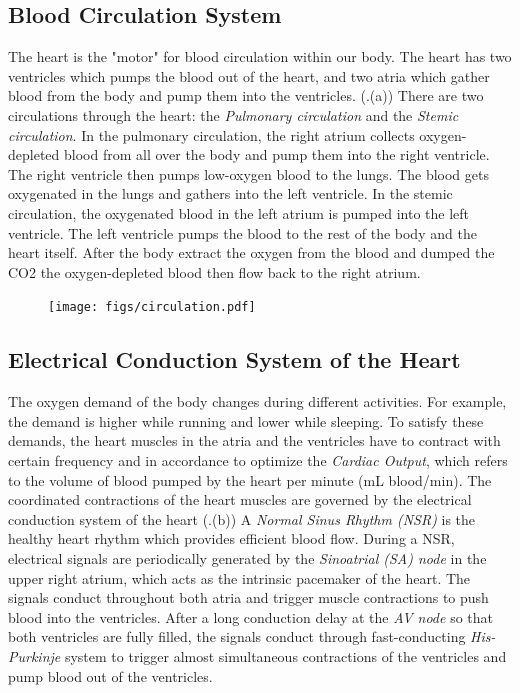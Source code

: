 \subsection{Blood Circulation System}
The heart is the "motor" for blood circulation within our body. The heart has two ventricles which pumps the blood out of the heart, and two atria which gather blood from the body and pump them into the ventricles. (.(a)) There are two circulations through the heart: the \emph{Pulmonary circulation} and the \emph{Stemic circulation}. In the pulmonary circulation, the right atrium collects oxygen-depleted blood from all over the body and pump them into the right ventricle. The right ventricle then pumps low-oxygen blood to the lungs. The blood gets oxygenated in the lungs and gathers into the left ventricle. In the stemic circulation, the oxygenated blood in the left atrium is pumped into the left ventricle. The left ventricle pumps the blood to the rest of the body and the heart itself. After the body extract the oxygen from the blood and dumped the CO2 the oxygen-depleted blood then flow back to the right atrium.
\begin{figure}[!t]
\centering
		\texttt{[image: figs/circulation.pdf]}
		
\caption{\small }
\label{fig:circulation}
\end{figure} 
\subsection{Electrical Conduction System of the Heart}
The oxygen demand of the body changes during different activities. For example, the demand is higher while running and lower while sleeping. To satisfy these demands, the heart muscles in the atria and the ventricles have to contract with certain frequency and in accordance to optimize the \emph{Cardiac Output}, which refers to the volume of blood pumped by the heart per minute (mL blood/min). The coordinated contractions of the heart muscles are governed by the electrical conduction system of the heart (.(b)) A \emph{Normal Sinus Rhythm (NSR)} is the healthy heart rhythm which provides efficient blood flow. During a NSR, electrical signals are periodically generated by the \emph{Sinoatrial (SA) node} in the upper right atrium, which acts as the intrinsic pacemaker of the heart. The signals conduct throughout both atria and trigger muscle contractions to push blood into the ventricles. After a long conduction delay at the \emph{AV node} so that both ventricles are fully filled, the signals conduct through fast-conducting \emph{His-Purkinje} system to trigger almost simultaneous contractions of the ventricles and pump blood out of the ventricles. 

